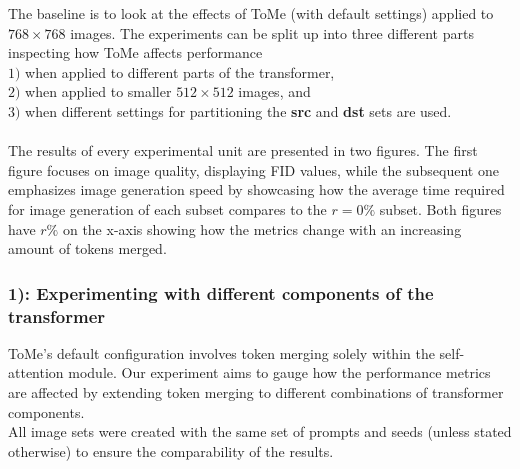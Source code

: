 The baseline is to look at the effects of ToMe (with default settings) applied to $768 \times 768$ images. The experiments can be split up into three different parts inspecting how ToMe affects performance\\ \(1)\) when applied to different parts of the transformer,\\ \(2)\) when applied to smaller $512 \times 512$ images, and\\ \(3)\) when different settings for partitioning the \textbf{src} and \textbf{dst} sets are used.\\
\\
The results of every experimental unit are presented in two figures. The first figure focuses on image quality, displaying FID values, while the subsequent one emphasizes image generation speed by showcasing how the average time required for image generation of each subset compares to the \(r=0\%\) subset.
Both figures have \(r\%\) on the x-axis showing how the metrics change with an increasing amount of tokens merged.

\subsubsection*{1): Experimenting with different components of the transformer}
ToMe's default configuration involves token merging solely within the self-attention module.
Our experiment aims to gauge how the performance metrics are affected by extending token merging to different combinations of transformer components.\\
All image sets were created with the same set of prompts and seeds (unless stated otherwise) to ensure the comparability of the results.



